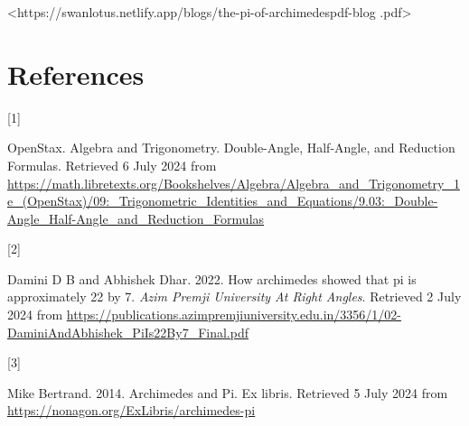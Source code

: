 \documentclass[
  a4paper,
]{article}
\newlength{\cslhangindent}
\newlength{\csllabelwidth}
\newenvironment{CSLReferences}[2] %
 {\begin{list}{}{%
  \setlength{\itemindent}{0pt}
  \setlength{\leftmargin}{0pt}
  \setlength{\parsep}{0pt}
  \ifodd #1
   \setlength{\leftmargin}{\cslhangindent}
   \setlength{\itemindent}{-1\cslhangindent}
  \fi
  \setlength{\itemsep}{#2\baselineskip}}}
 {\end{list}}
\newcommand{\CSLLeftMargin}[1]{\parbox[t]{\csllabelwidth}{\strut#1\strut}}
\newcommand{\CSLRightInline}[1]{\parbox[t]{\linewidth - \csllabelwidth}{\strut#1\strut}}
\begin{document}
\begin{small}

\begin{sffamily}

\textless https://swanlotus.netlify.app/blogs/the-pi-of-archimedespdf-blog
.pdf\textgreater{}

\end{sffamily}

\end{small}

\section*{References}\label{bibliography}

\label{refs}
\begin{CSLReferences}{0}{0}
\CSLLeftMargin{{[}1{]} }%
\CSLRightInline{OpenStax. {Algebra and Trigonometry}. {Double-Angle,
Half-Angle, and Reduction Formulas}. Retrieved 6 July 2024 from
\url{https://math.libretexts.org/Bookshelves/Algebra/Algebra_and_Trigonometry_1e_(OpenStax)/09:_Trigonometric_Identities_and_Equations/9.03:_Double-Angle_Half-Angle_and_Reduction_Formulas}}

\CSLLeftMargin{{[}2{]} }%
\CSLRightInline{Damini D B and Abhishek Dhar. 2022. How archimedes
showed that pi is approximately 22 by 7. \emph{{Azim Premji University
At Right Angles}}. Retrieved 2 July 2024 from
\url{https://publications.azimpremjiuniversity.edu.in/3356/1/02-DaminiAndAbhishek_PiIs22By7_Final.pdf}}

\CSLLeftMargin{{[}3{]} }%
\CSLRightInline{Mike Bertrand. 2014. {Archimedes and Pi}. Ex libris.
Retrieved 5 July 2024 from
\url{https://nonagon.org/ExLibris/archimedes-pi}}

\end{CSLReferences}
\end{document}
